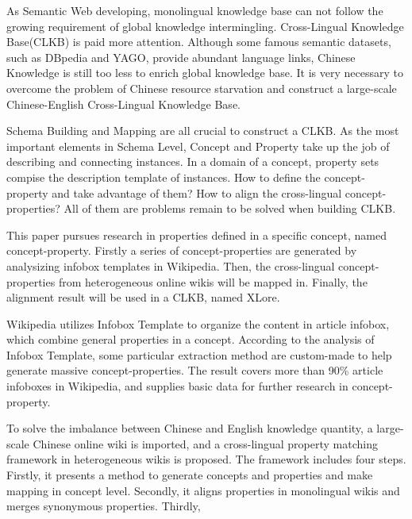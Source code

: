 \begin{eabstract}
As Semantic Web developing, monolingual knowledge base can not follow the growing requirement of global knowledge intermingling. Cross-Lingual Knowledge Base(CLKB) is paid more attention. Although some famous semantic datasets, such as DBpedia and YAGO, provide abundant language links, Chinese Knowledge is still too less to enrich global knowledge base. It is very necessary to overcome the problem of Chinese resource starvation and construct a large-scale Chinese-English Cross-Lingual Knowledge Base.

Schema Building and Mapping are all crucial to construct a CLKB. As the most important elements in Schema Level, Concept and Property take up the job of describing and connecting instances. In a domain of a concept, property sets compise the description template of instances. How to define the concept-property and take advantage of them? How to align the cross-lingual concept-properties? All of them are problems remain to be solved when building CLKB.

This paper pursues research in properties defined in a specific concept, named concept-property. Firstly a series of concept-properties are generated by analysizing infobox templates in Wikipedia. Then, the cross-lingual concept-properties from heterogeneous online wikis will be mapped in. Finally, the alignment result will be used in a CLKB, named XLore.

Wikipedia utilizes Infobox Template to organize the content in article infobox, which combine general properties in a concept. According to the analysis of Infobox Template, some particular extraction method are custom-made to help generate massive concept-properties. The result covers more than 90\% article infoboxes in Wikipedia, and supplies basic data for further research in concept-property.

To solve the imbalance between Chinese and English knowledge quantity, a large-scale Chinese online wiki is imported, and a cross-lingual property matching framework in heterogeneous wikis is proposed. The framework includes four steps. Firstly, it presents a method to generate concepts and properties and make mapping in concept level. Secondly, it aligns properties in monolingual wikis and merges synonymous properties. Thirdly,

\end{eabstract}

